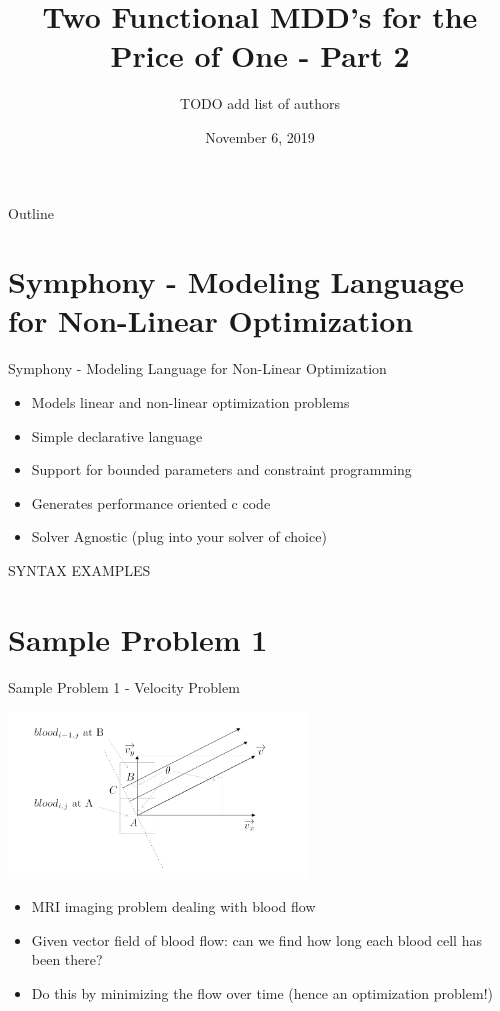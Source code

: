 \documentclass[presentation]{beamer}
\author{TODO add list of authors}
\date{November 6, 2019}
\title{Two Functional MDD's for the Price of One - Part 2}
\begin{document}
\maketitle
\begin{frame}{Outline}
\tableofcontents
\end{frame}


\section{Symphony - Modeling Language for Non-Linear Optimization}
\label{sec:org5ab5078}
\begin{frame}[label={sec:org5cb1731}]{Symphony - Modeling Language for Non-Linear Optimization}
\begin{itemize}
\item Models linear and non-linear optimization problems
\item Simple declarative language
\item Support for bounded parameters and constraint programming
\item Generates performance oriented c code
\item Solver Agnostic (plug into your solver of choice)
\end{itemize}
\end{frame}
\begin{frame}[label={sec:orgf3625e4}]{SYNTAX EXAMPLES}
\end{frame}

\section{Sample Problem 1}
\label{sec:org94a0e83}
\begin{frame}[label={sec:org802260d}]{Sample Problem 1 - Velocity Problem}
\begin{center}
\includegraphics[width=8cm]{figs/velocity.png}
\end{center}
\begin{itemize}
\item MRI imaging problem dealing with blood flow
\item Given vector field of blood flow: can we find how long each blood cell has been there?
\item Do this by minimizing the \alert{flow} over time (hence an optimization problem!)
\end{itemize}
\end{frame}
\end{document}

